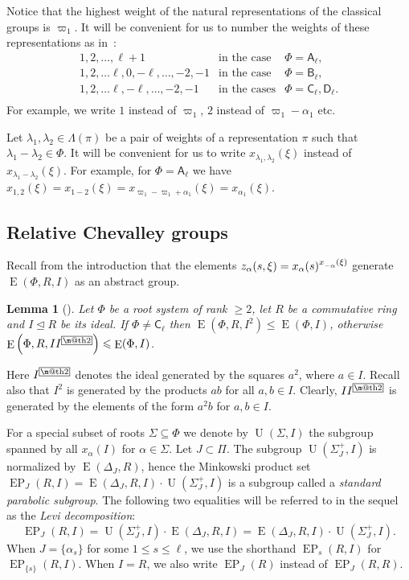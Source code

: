 \documentclass[oneside, 12pt]{amsart}
\makeatletter
\theoremstyle{plain}
\numberwithin{equation}{section}
\newtheorem{lemma}{Lemma}
\numberwithin{lemma}{section}
\theoremstyle{definition}
\theoremstyle{remark}
\DeclareMathOperator{\E}{E}
\DeclareMathOperator{\EP}{EP}
\DeclareMathOperator{\U}{U}
\newcommand{\rA}{\mathsf{A}}
\newcommand{\rB}{\mathsf{B}}
\newcommand{\rC}{\mathsf{C}}
\newcommand{\rD}{\mathsf{D}}
\newcommand{\indexbox}[1]{\text{\fboxsep=.1em\fbox{\m@th$\displaystyle#1$}}}
\def\ssub#1{\mathchoice
   {_{\lower2pt\hbox{$\scriptstyle #1$}}}
   {_{\lower2pt\hbox{$\scriptstyle #1$}}}
   {_{\lower1.5pt\hbox{$\scriptscriptstyle #1$}}}
   {_{\!\lower1.5pt\hbox{$\scriptscriptstyle #1$}}}}
\makeatother
\begin{document}
Notice that the highest weight of the natural representations of the classical groups is $\varpi_1$.
It will be convenient for us to number the weights of these representations as in~\cite[\S~1B]{St78}:
\[\begin{array}{cll}
  1, 2, \ldots, \ell+1 & \text{in the case} & \Phi =\rA_\ell, \\
  1, 2, \ldots \ell, 0, -\ell, \ldots, -2, -1 & \text{in the case} & \Phi =\rB_\ell, \\
  1, 2, \ldots \ell, -\ell, \ldots, -2, -1 & \text{in the cases}   & \Phi =\rC_\ell, \rD_\ell. \\
\end{array}\]
For example, we write $1$ instead of $\varpi_1$, $2$ instead of $\varpi_1-\alpha_1$ etc.

Let $\lambda_1, \lambda_2 \in \Lambda(\pi)$ be a pair of weights of a representation $\pi$ such that $\lambda_1-\lambda_2\in \Phi$.
It will be convenient for us to write $x_{\lambda_1, \lambda_2}(\xi)$ instead of $x_{\lambda_1-\lambda_2}(\xi)$.
For example, for $\Phi=\rA_\ell$ we have $x_{1, 2}(\xi)=x_{1-2}(\xi)=x_{\varpi_1 - \varpi_1 + \alpha_1}(\xi) = x_{\alpha_1}(\xi)$.

\subsection{Relative Chevalley groups}\label{sec:relative-elementary}
Recall from the introduction that the elements $z_\alpha(s, \xi) = x_\alpha(s)^{x\ssub{-\alpha}(\xi)}$ generate $\E(\Phi, R, I)$ as an abstract group.

\begin{lemma}[{\cite[Corollary~3.3]{S}}]\label{lemma:Stepanov-ideal}
Let $\Phi$ be a root system of rank $\geqslant2$, let $R$ be a commutative ring and $I\trianglelefteq R$ be its ideal.
If $\Phi\neq\rC_\ell$ then $\E\left(\Phi, R, I^2\right)\leqslant\E(\Phi, I)$, otherwise $\E\left(\Phi, R, II^{\indexbox{2}}\right)\leqslant\E(\Phi, I)$.
\end{lemma}
Here $I^{\indexbox{2}}$ denotes the ideal generated by the squares $a^2$, where $a\in I$.
Recall also that $I^2$ is generated by the products $ab$ for all $a, b\in I$.
Clearly, $II^{\indexbox{2}}$ is generated by the elements of the form $a^2b$ for $a, b\in I$.

For a special subset of roots $\Sigma\subseteq \Phi$ we denote by $\U(\Sigma, I)$ the subgroup spanned by all $x_{\alpha}(I)$ for $\alpha\in \Sigma$. Let $J\subset\Pi$.
The subgroup $\U(\Sigma_J^+, I)$ is normalized by $\E(\Delta_J, R)$, hence the Minkowski product set $\EP_J(R, I) = \E(\Delta_J, R, I) \cdot \U(\Sigma_J^+, I)$ is a subgroup called a \emph{standard parabolic subgroup}.
The following two equalities will be referred to in the sequel as the \emph{Levi decomposition}:
\begin{equation} \label{rel:Levi-decomp} \EP_J(R, I) = \U(\Sigma_J^+, I) \cdot \E(\Delta_J, R, I) = \E(\Delta_J, R, I) \cdot \U(\Sigma_J^+, I). \end{equation}
When $J = \{ \alpha_s \}$ for some $1 \leq s\leq \ell$, we use the shorthand $\EP_s(R, I)$ for $\EP_{\{s\}}(R, I)$.
When $I=R$, we also write $\EP_J(R)$ instead of $\EP_J(R, R)$.
\end{document}
